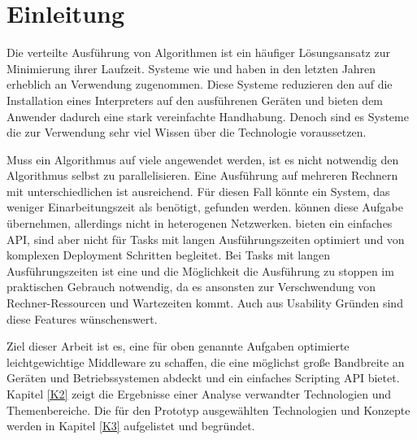 
\chapter{Einleitung}
\label{K1}


Die verteilte Ausführung von Algorithmen ist ein häufiger Lösungsansatz zur Minimierung ihrer Laufzeit.
Systeme wie \MapReduce{} und \ApacheSpark{} haben in den letzten Jahren erheblich an Verwendung zugenommen.
Diese Systeme reduzieren den \DeploymentAufwand{} auf die Installation eines Interpreters auf den ausführenen Geräten und bieten dem Anwender dadurch eine stark vereinfachte Handhabung.
Denoch sind es Systeme die zur Verwendung sehr viel Wissen über die Technologie voraussetzen.

Muss ein Algorithmus auf viele \InputDateien{} angewendet werden, ist es nicht notwendig den Algorithmus selbst zu parallelisieren.
Eine Ausführung auf mehreren Rechnern mit unterschiedlichen \InputDateien{} ist ausreichend.
Für diesen Fall könnte ein System, das weniger Einarbeitungszeit als \ApacheSpark{} benötigt, gefunden werden.
\ShellScripts{} können diese Aufgabe übernehmen, allerdings nicht in heterogenen Netzwerken.
\RemoteProcedureCalls{} bieten ein einfaches API, sind aber nicht für Tasks mit langen Ausführungszeiten optimiert und von komplexen Deployment Schritten begleitet.
Bei Tasks mit langen Ausführungszeiten ist eine \ProgressAnzeige{} und die Möglichkeit die Ausführung zu stoppen im praktischen Gebrauch notwendig, da es ansonsten zur Verschwendung von Rechner-Ressourcen und Wartezeiten kommt.
Auch aus Usability Gründen sind diese Features wünschenswert.

Ziel dieser Arbeit ist es, eine für oben genannte Aufgaben optimierte leichtgewichtige Middleware zu schaffen, die eine möglichst große Bandbreite an Geräten und Betriebssystemen abdeckt und ein einfaches Scripting API bietet.
Kapitel \ref{K2} zeigt die Ergebnisse einer Analyse verwandter Technologien und Themenbereiche.
Die für den Prototyp ausgewählten Technologien und Konzepte werden in Kapitel \ref{K3} aufgelistet und begründet.


